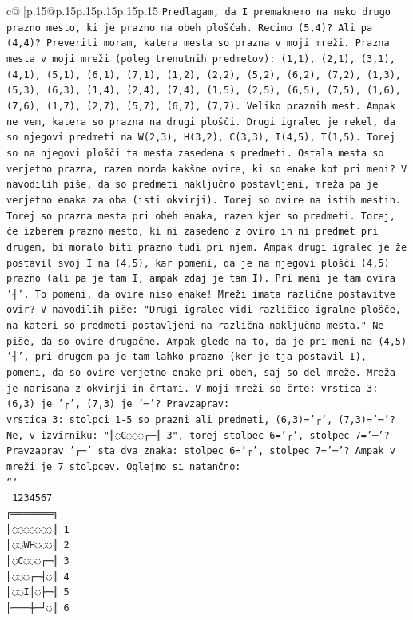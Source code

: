 \documentclass{article}
\begin{document}
{\begin{supertabular}{c@{$\;$}|p{.15\linewidth}@{}p{.15\linewidth}p{.15\linewidth}p{.15\linewidth}p{.15\linewidth}p{.15\linewidth}}
{{{\texttt{Predlagam, da I premaknemo na neko drugo prazno mesto, ki je prazno na obeh ploščah. Recimo (5,4)? Ali pa (4,4)? Preveriti moram, katera mesta so prazna v moji mreži. Prazna mesta v moji mreži (poleg trenutnih predmetov): (1,1), (2,1), (3,1), (4,1), (5,1), (6,1), (7,1), (1,2), (2,2), (5,2), (6,2), (7,2), (1,3), (5,3), (6,3), (1,4), (2,4), (7,4), (1,5), (2,5), (6,5), (7,5), (1,6), (7,6), (1,7), (2,7), (5,7), (6,7), (7,7). Veliko praznih mest. Ampak ne vem, katera so prazna na drugi plošči. Drugi igralec je rekel, da so njegovi predmeti na W(2,3), H(3,2), C(3,3), I(4,5), T(1,5). Torej so na njegovi plošči ta mesta zasedena s predmeti. Ostala mesta so verjetno prazna, razen morda kakšne ovire, ki so enake kot pri meni? V navodilih piše, da so predmeti naključno postavljeni, mreža pa je verjetno enaka za oba (isti okvirji). Torej so ovire na istih mestih. Torej so prazna mesta pri obeh enaka, razen kjer so predmeti. Torej, če izberem prazno mesto, ki ni zasedeno z oviro in ni predmet pri drugem, bi moralo biti prazno tudi pri njem. Ampak drugi igralec je že postavil svoj I na (4,5), kar pomeni, da je na njegovi plošči (4,5) prazno (ali pa je tam I, ampak zdaj je tam I). Pri meni je tam ovira '┤'. To pomeni, da ovire niso enake! Mreži imata različne postavitve ovir? V navodilih piše: "Drugi igralec vidi različico igralne plošče, na kateri so predmeti postavljeni na različna naključna mesta." Ne piše, da so ovire drugačne. Ampak glede na to, da je pri meni na (4,5) '┤', pri drugem pa je tam lahko prazno (ker je tja postavil I), pomeni, da so ovire verjetno enake pri obeh, saj so del mreže. Mreža je narisana z okvirji in črtami. V moji mreži so črte: vrstica 3: (6,3) je '┌', (7,3) je '─'? Pravzaprav:} \\
\texttt{vrstica 3: stolpci 1{-}5 so prazni ali predmeti, (6,3)='┌', (7,3)='─'? Ne, v izvirniku: "║◌C◌◌◌┌─╢ 3", torej stolpec 6='┌', stolpec 7='─'? Pravzaprav '┌─' sta dva znaka: stolpec 6='┌', stolpec 7='─'? Ampak v mreži je 7 stolpcev. Oglejmo si natančno:} \\
\texttt{```} \\
\texttt{ 1234567} \\
\texttt{╔═══════╗} \\
\texttt{║◌◌◌◌◌◌◌║ 1} \\
\texttt{║◌◌WH◌◌◌║ 2} \\
\texttt{║◌C◌◌◌┌─╢ 3} \\
\texttt{║◌◌◌┌─┤◌║ 4} \\
\texttt{║◌◌I│◌├─╢ 5} \\
\texttt{╟───┼─┘◌║ 6} \\
}}}
\end{supertabular}}
\end{document}

